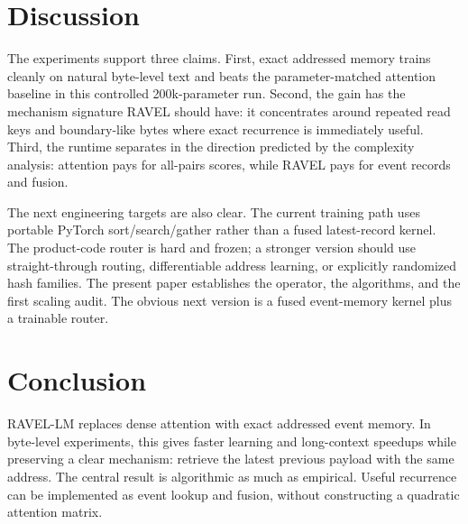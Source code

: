 \documentclass[10pt]{article}
\begin{document}
\section{Discussion}

The experiments support three claims. First, exact addressed memory trains cleanly on natural byte-level text and beats the parameter-matched attention baseline in this controlled 200k-parameter run. Second, the gain has the mechanism signature RAVEL should have: it concentrates around repeated read keys and boundary-like bytes where exact recurrence is immediately useful. Third, the runtime separates in the direction predicted by the complexity analysis: attention pays for all-pairs scores, while RAVEL pays for event records and fusion.

The next engineering targets are also clear. The current training path uses portable PyTorch sort/search/gather rather than a fused latest-record kernel. The product-code router is hard and frozen; a stronger version should use straight-through routing, differentiable address learning, or explicitly randomized hash families. The present paper establishes the operator, the algorithms, and the first scaling audit. The obvious next version is a fused event-memory kernel plus a trainable router.

\section{Conclusion}

RAVEL-LM replaces dense attention with exact addressed event memory. In byte-level experiments, this gives faster learning and long-context speedups while preserving a clear mechanism: retrieve the latest previous payload with the same address. The central result is algorithmic as much as empirical. Useful recurrence can be implemented as event lookup and fusion, without constructing a quadratic attention matrix.
\end{document}

